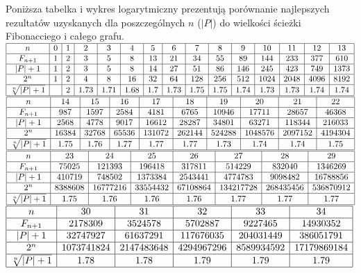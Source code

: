 \documentclass{pracamgr}
\begin{document}
     Poniższa tabelka i wykres logarytmiczny prezentują porównanie najlepszych rezultatów uzyskanych dla poszczególnych $n$ ($|P|$) do wielkości ścieżki
     Fibonacciego i całego grafu.
     $\begin{array}{|c|c|c|c|c|c|c|c|c|c|c|c|c|c|c|}
      \hline
      n&0&1&2&3&4&5&6&7&8&9&10&11&12&13\\
      \hline
      F_{n+1}&1&2&3&5&8&13&21&34&55&89&144&233&377&610\\
      \hline
      |P|+1&1&2&3&5&8&14&27&51&86&146&245&423&749&1373\\
      \hline
      2^n&1&2&4&8&16&32&64&128&256&512&1024&2048&4096&8192\\
      \hline
      \sqrt[n]{|P|+1}&&2&1.73&1.71&1.68&1.7&1.73&1.75&1.75&1.74&1.73&1.73&1.74&1.74\\
      \hline
     \end{array}$\newline
     $\begin{array}{|c|c|c|c|c|c|c|c|c|c|}
      \hline
      n&14&15&16&17&18&19&20&21&22\\
      \hline
      F_{n+1}&987&1597&2584&4181&6765&10946&17711&28657&46368\\
      \hline
      |P|+1&2568&4778&9017&16612&28287&34801&63271&118344&216033\\
      \hline
      2^n&16384&32768&65536&131072&262144&524288&1048576&2097152&4194304\\
      \hline
      \sqrt[n]{|P|+1}&1.75&1.76&1.77&1.77&1.77&1.73&1.74&1.74&1.75\\
      \hline
     \end{array}$\newline
     $\begin{array}{|c|c|c|c|c|c|c|c|}
      \hline
      n&23&24&25&26&27&28&29\\
      \hline
      F_{n+1}&75025&121393&196418&317811&514229&832040&1346269\\
      \hline
      |P|+1&410719&748502&1373384&2543441&4774783&9098482&16788856\\
      \hline
      2^n&8388608&16777216&33554432&67108864&134217728&268435456&536870912\\
      \hline
      \sqrt[n]{|P|+1}&1.75&1.76&1.76&1.76&1.77&1.77&1.77\\
      \hline
     \end{array}$\newline
      $\begin{array}{|c|c|c|c|c|c|}
      \hline
      n&30&31&32&33&34\\
      \hline
      F_{n+1}&2178309&3524578&5702887&9227465&14930352\\
      \hline
      |P|+1&32747927&61637291&117676035&204031449&386051791\\
      \hline
      2^n&1073741824&2147483648&4294967296&8589934592&17179869184\\
      \hline
      \sqrt[n]{|P|+1}&1.78&1.78&1.79&1.79&1.79\\
      \hline
     \end{array}$\newline
\end{document}
